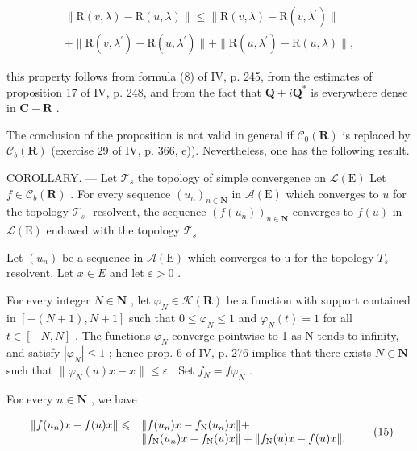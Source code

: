 \[
\begin{array}{c} \| \mathrm{R} (v, \lambda) - \mathrm{R} (u, \lambda) \| \leqslant \| \mathrm{R} (v, \lambda) - \mathrm{R} (v, \lambda^ {\prime}) \| \\ + \| \mathrm{R} (v, \lambda^ {\prime}) - \mathrm{R} (u, \lambda^ {\prime}) \| + \| \mathrm{R} (u, \lambda^ {\prime}) - \mathrm{R} (u, \lambda) \|, \end{array}
\]

this property follows from formula (8) of IV, p. 245, from the estimates of proposition 17 of IV, p. 248, and from the fact that \(\mathbf{Q} + i\mathbf{Q}^*\) is everywhere dense in \(\mathbf{C} - \mathbf{R}\) .

The conclusion of the proposition is not valid in general if \(\mathcal{C}_{0}(\mathbf{R})\) is replaced by \(\mathcal{C}_{b}(\mathbf{R})\) (exercise 29 of IV, p. 366, e)). Nevertheless, one has the following result.

COROLLARY. --- Let \(\mathcal{T}_{s}\) the topology of simple convergence on \(\mathcal{L}(\mathrm{E})\) Let \(f \in \mathcal{C}_{b}(\mathbf{R})\) . For every sequence \((u_{n})_{n \in \mathbf{N}}\) in \(\mathcal{A}(\mathrm{E})\) which converges to \(u\) for the topology \(\mathcal{T}_{s}\) -resolvent, the sequence \((f(u_{n}))_{n \in \mathbf{N}}\) converges to \(f(u)\) in \(\mathcal{L}(\mathrm{E})\) endowed with the topology \(\mathcal{T}_{s}\) .

Let \((u_{n})\) be a sequence in \(\mathcal{A}(\mathrm{E})\) which converges to u for the topology \(T_{s}\) -resolvent. Let \(x \in E\) and let \(\varepsilon > 0\) .

For every integer \(N \in \mathbf{N}\) , let \(\varphi_{N} \in \mathcal{K}(\mathbf{R})\) be a function with support contained in \([-(N+1), N+1]\) such that \(0 \leqslant \varphi_{N} \leqslant 1\) and \(\varphi_{N}(t) = 1\) for all \(t \in [-N, N]\) . The functions \(\varphi_{N}\) converge pointwise to 1 as N tends to infinity, and satisfy \(|\varphi_{N}| \leqslant 1\) ; hence prop. 6 of IV, p. 276 implies that there exists \(N \in \mathbf{N}\) such that \(\|\varphi_{N}(u)x - x\| \leqslant \varepsilon\) . Set \(f_{N} = f\varphi_{N}\) .

For every \(n\in \mathbf{N}\) , we have

\[
\begin{array}{r l} \| f (u _ {n}) x - f (u) x \| \leqslant & \| f (u _ {n}) x - f _ {\mathrm{N}} (u _ {n}) x \| + \\ & \| f _ {\mathrm{N}} (u _ {n}) x - f _ {\mathrm{N}} (u) x \| + \| f _ {\mathrm{N}} (u) x - f (u) x \|. \end{array} \tag {15}
\]

